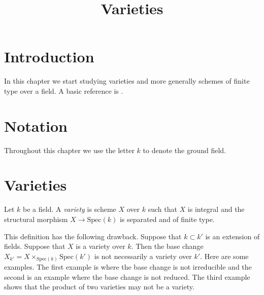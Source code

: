 

%


\title{Varieties}


\maketitle

\label{section-phantom}

\tableofcontents

\section{Introduction}
\label{section-introduction}

\noindent
In this chapter we start studying varieties and more generally
schemes of finite type over a field. A basic reference is \cite{EGA}.








\section{Notation}
\label{section-notation}

\noindent
Throughout this chapter we use the letter $k$ to denote the ground field.









\section{Varieties}
\label{section-varieties}

\begin{definition}
\label{definition-variety}
Let $k$ be a field. A {\it variety} is scheme $X$ over $k$
such that $X$ is integral and the structural morphism
$X \to \text{Spec}(k)$ is separated and of finite type.
\end{definition}

\noindent
This definition has the following drawback. Suppose that
$k \subset k'$ is an extension of fields. Suppose that $X$
is a variety over $k$. Then the base change
$X_{k'} = X \times_{\text{Spec}(k)} \text{Spec}(k')$ is
not necessarily a variety over $k'$. Here are some examples.
The first example is where the base change is not irreducible
and the second is an example where the base change is not
reduced. The third example shows that the product of two varieties
may not be a variety.

